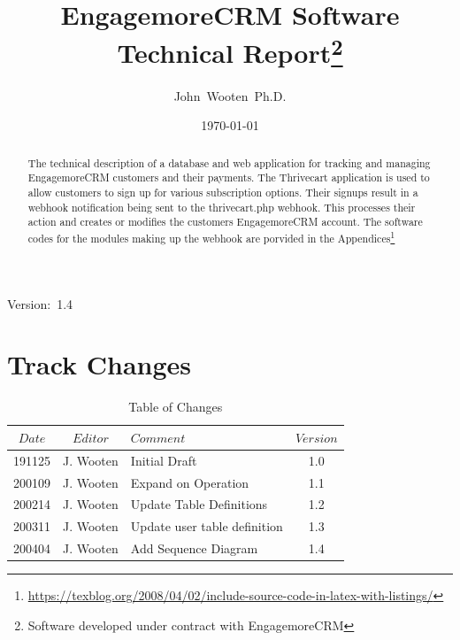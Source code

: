 \documentclass[final,letterpaper,12pt]{article}
\author{John~Wooten~Ph.D.\\
}
\date{\today \\
}
\title{EngagemoreCRM Software Technical Report\thanks{Software developed under contract with EngagemoreCRM}}
\begin{document}
\maketitle
\begin{center}
Version:~1.4
\end{center}

\begin {abstract}
\noindent The technical description of a database and web application
for tracking and managing EngagemoreCRM customers and their payments.
The Thrivecart application is used to allow customers to sign up for various
subscription options.  Their signups result in a webhook notification being sent to
the thrivecart.php webhook.  This processes their action and creates or modifies
the customers EngagemoreCRM account.  The software codes for the modules making up the webhook are porvided in the Appendices\footnote{\url{https://texblog.org/2008/04/02/include-source-code-in-latex-with-listings/}}
\end{abstract}
\newpage
\tableofcontents
\newpage
\listoffigures
\listoftables

\newpage
\section{Track Changes}
\begin{table}[h]
\begin{center}
\begin{tabular}{|c|c|l|c|} \hline
$ Date $ & $Editor$ & $Comment$ & $Version$ \\
\hline
191125 & J. Wooten & Initial Draft & 1.0  \\
200109 & J. Wooten & Expand on Operation & 1.1 \\
200214 & J. Wooten & Update Table Definitions & 1.2 \\
200311 & J. Wooten & Update user table definition & 1.3 \\
200404 & J. Wooten & Add Sequence Diagram & 1.4 \\
\hline
\end{tabular}
\end{center}
\caption {Table of Changes}
\label{tab:cqdata0}
\end{table}

\newpage
\end{document}
